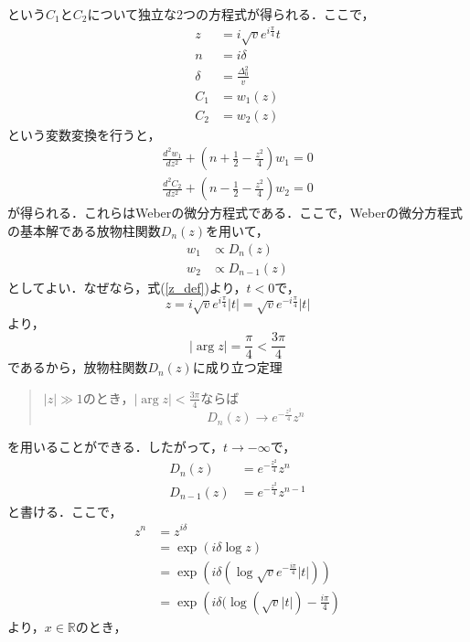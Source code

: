 \documentclass[a4paper, titlepage]{jsreport}
\begin{document}
という$C_1$と$C_2$について独立な2つの方程式が得られる．ここで，
\begin{align}
  z &= i\sqrt{v} e^{i\frac{\pi}{4}} t \label{z_def}\\
  n &= i\delta\\
  \delta &= \frac{\Delta_0^2}{v}\\
  C_1 &= w_1(z)\\
  C_2 &= w_2(z)
\end{align}
という変数変換を行うと，
\begin{align}
  \frac{d^2 w_1}{d z^2} + \left(n + \frac{1}{2} - \frac{z^2}{4}\right) w_1 = 0\\
  \frac{d^2 C_2}{d z^2} + \left(n - \frac{1}{2} - \frac{z^2}{4}\right) w_2 = 0
\end{align}
が得られる．これらはWeberの微分方程式である．ここで，Weberの微分方程式の基本解である放物柱関数$D_n(z)$を用いて，
\begin{align}
  w_1 &\propto D_n(z)\\
  w_2 &\propto D_{n-1}(z)
\end{align}
としてよい．なぜなら，式(\ref{z_def})より，$t<0$で，
\begin{equation}
  z = i\sqrt{v} e^{i\frac{\pi}{4}} |t| = \sqrt{v} e^{-i\frac{\pi}{4}} |t|
\end{equation}
より，
\begin{equation}
  |\arg z| = \frac{\pi}{4} < \frac{3\pi}{4}
\end{equation}
であるから，放物柱関数$D_n(z)$に成り立つ定理
\begin{quote}
  $|z| \gg 1$のとき，$|\arg z| < \frac{3\pi}{4}$ならば
  \begin{equation}
    D_n(z) \rightarrow e^{-\frac{z^2}{4}} z^n
  \end{equation}
\end{quote}
を用いることができる．したがって，$t \rightarrow - \infty$で，
\begin{align}
  D_n(z) &= e^{-\frac{z^2}{4}} z^n\\
  D_{n-1}(z) &= e^{-\frac{z^2}{4}} z^{n-1}
\end{align}
と書ける．ここで，
\begin{align}
  z^n &= z^{i\delta}\\
  &= \exp(i\delta \log z)\\
  &= \exp(i\delta (\log \sqrt{v} e^{-\frac{i\pi}{4}} |t|))\\
  &= \exp \left( i\delta (\log (\sqrt{v} |t|) - \frac{i\pi}{4} \right)
\end{align}
より，$x \in \mathbb{R}$のとき，
\end{document}
